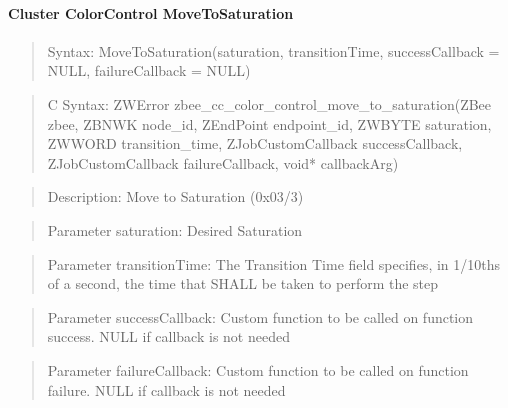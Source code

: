 \paragraph{Cluster ColorControl MoveToSaturation}
\begin{quote}Syntax: MoveToSaturation(saturation, transitionTime, successCallback = NULL, failureCallback = NULL)\end{quote}
\begin{quote}C Syntax: ZWError zbee\_cc\_color\_control\_move\_to\_saturation(ZBee zbee, ZBNWK node\_id, ZEndPoint endpoint\_id, ZWBYTE saturation, ZWWORD transition\_time, ZJobCustomCallback successCallback, ZJobCustomCallback failureCallback, void* callbackArg)\end{quote}
\begin{quote}Description: Move to Saturation (0x03/3)\end{quote}
\begin{quote}Parameter saturation: Desired Saturation\end{quote}
\begin{quote}Parameter transitionTime: The Transition Time field specifies, in 1/10ths of a second, the time that SHALL be taken to perform the step\end{quote}
\begin{quote}Parameter successCallback: Custom function to be called on function success. NULL if callback is not needed\end{quote}
\begin{quote}Parameter failureCallback: Custom function to be called on function failure. NULL if callback is not needed\end{quote}


